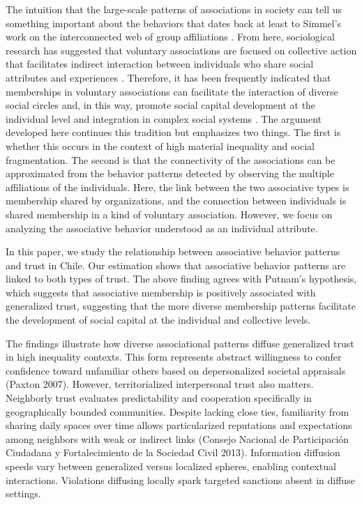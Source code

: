 The intuition that the large-scale patterns of associations in society can tell us something important about the behaviors that dates back at least to Simmel's work on the interconnected web of group affiliations \parencite{centola_how_2018, simmel_conflict_1922}. From here, sociological research has suggested that voluntary associations are focused on collective action that facilitates indirect interaction between individuals who share social attributes and experiences \parencite{mcpherson_hypernetwork_1982}. Therefore, it has been frequently indicated that memberships in voluntary associations can facilitate the interaction of diverse social circles and, in this way, promote social capital development at the individual level \parencite{tindall_network_2012} and integration in complex social systems \parencite{paxton_association_2007}. The argument developed here continues this tradition but emphasizes two things. The first is whether this occurs in the context of high material inequality and social fragmentation. The second is that the connectivity of the associations can be approximated from the behavior patterns detected by observing the multiple affiliations of the individuals. Here, the link between the two associative types is membership shared by organizations, and the connection between individuals is shared membership in a kind of voluntary association. However, we focus on analyzing the associative behavior understood as an individual attribute.
\bigskip

In this paper, we study the relationship between associative behavior patterns and trust in Chile. Our estimation shows that associative behavior patterns are linked to both types of trust. The above finding agrees with Putnam’s hypothesis, which suggests that associative membership is positively associated with generalized trust, suggesting that the more diverse membership patterns facilitate the development of social capital at the individual and collective levels. 
\bigskip

The findings illustrate how diverse associational patterns diffuse generalized trust in high inequality contexts. This form represents abstract willingness to confer confidence toward unfamiliar others based on depersonalized societal appraisals (Paxton 2007). However, territorialized interpersonal trust also matters. Neighborly trust evaluates predictability and cooperation specifically in geographically bounded communities. Despite lacking close ties, familiarity from sharing daily spaces over time allows particularized reputations and expectations among neighbors with weak or indirect links (Consejo Nacional de Participación Ciudadana y Fortalecimiento de la Sociedad Civil 2013). Information diffusion speeds vary between generalized versus localized spheres, enabling contextual interactions. Violations diffusing locally spark targeted sanctions absent in diffuse settings.
\bigskip

